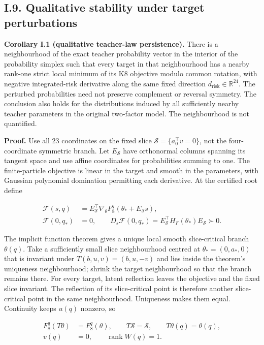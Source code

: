 \documentclass{article}
\begin{document}
\subsection*{I.9. Qualitative stability under target
perturbations}\label{local-persistence}

\textbf{Corollary I.1 (qualitative teacher-law persistence).} There is a
neighbourhood of the exact teacher probability vector in the interior of
the probability simplex such that every target in that neighbourhood has
a nearby rank-one strict local minimum of its K8 objective modulo common
rotation, with negative integrated-risk derivative along the same fixed
direction \(d_{\mathrm{risk}}\in\mathbb R^{24}\). The perturbed
probabilities need not preserve complement or reversal symmetry. The
conclusion also holds for the distributions induced by all sufficiently
nearby teacher parameters in the original two-factor model. The
neighbourhood is not quantified.

\textbf{Proof.} Use all 23 coordinates on the fixed slice
\(\mathcal S=\{a_0^\top v=0\}\), not the four-coordinate symmetric
branch. Let \(E_{\mathcal S}\) have orthonormal columns spanning its
tangent space and use affine coordinates for probabilities summing to
one. The finite-particle objective is linear in the target and smooth in
the parameters, with Gaussian polynomial domination permitting each
derivative. At the certified root define

\[
\begin{aligned}
\mathcal F(s,q)&=E_{\mathcal S}^\top\nabla_\theta F_8^q(\theta_*+E_{\mathcal S}s),\\
\mathcal F(0,q_*)&=0,\qquad
D_s\mathcal F(0,q_*)=E_{\mathcal S}^\top H_F(\theta_*)E_{\mathcal S}\succ0.
\end{aligned}
\tag{I.44}
\]

The implicit function theorem gives a unique local smooth slice-critical
branch \(\theta(q)\). Take a sufficiently small slice neighbourhood
centred at \(\theta_*=(0,a_*,0)\) that is invariant under
\(T(b,u,v)=(b,u,-v)\) and lies inside the theorem's uniqueness
neighbourhood; shrink the target neighbourhood so that the branch
remains there. For every target, latent reflection leaves the objective
and the fixed slice invariant. The reflection of its slice-critical
point is therefore another slice-critical point in the same
neighbourhood. Uniqueness makes them equal. Continuity keeps \(u(q)\)
nonzero, so

\[
\begin{aligned}
F_8^q(T\theta)&=F_8^q(\theta),\qquad T\mathcal S=\mathcal S,\qquad T\theta(q)=\theta(q),\\
v(q)&=0,\qquad \operatorname{rank}W(q)=1.
\end{aligned}
\]
\end{document}
